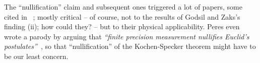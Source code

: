 The ``nullification'' claim and subsequent ones triggered a lot of papers, some cited in ~\cite{Barrett-2004};
mostly critical -- of course, not to the results of Godsil and Zaks's finding (ii); how could they? -- but to their physical applicability.
Peres even wrote a parody by arguing that  {\em ``finite precision measurement nullifies Euclid's postulates''}~\cite{peres-2003-fpnep},
so that ``nullification'' of the Kochen-Specker theorem might have to be our least concern.
%
%


